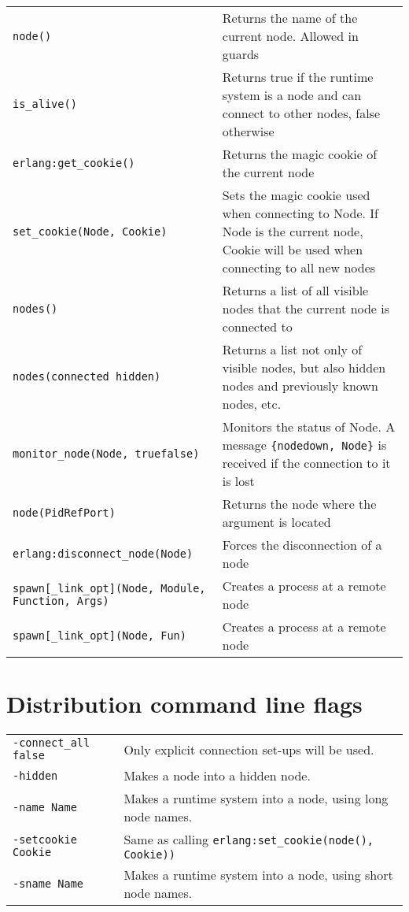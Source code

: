 \begin{center}
\begin{tabular}{|>{\raggedright}p{156pt}|>{\raggedright}p{170pt}|}
\hline
\multicolumn{2}{|p{326pt}|}{Distribution BIFs}\tabularnewline
\hline
\texttt{node()}  & Returns the name of the current node. Allowed in guards\tabularnewline
\hline
\texttt{is\_alive()}  & Returns true if the runtime system is a node and can connect to
other nodes, false otherwise\tabularnewline
\hline
\texttt{erlang:get\_cookie()}  & Returns the magic cookie of the current node\tabularnewline
\hline
\texttt{set\_cookie(Node, Cookie)} & Sets the magic cookie used when connecting to Node.
If Node is the current node, Cookie will be used when connecting to all new nodes\tabularnewline
\hline
\texttt{nodes()}  & Returns a list of all visible nodes that the current node is connected
to\tabularnewline
\hline
\texttt{nodes(connected \textbar{} hidden)}  & Returns a list not only of visible nodes,
but also hidden nodes and previously known nodes, etc. \tabularnewline
\hline
\texttt{monitor\_node(Node, true\textbar{}false)}  & Monitors the status of Node. A message
\texttt{\{nodedown, Node\}} is received if the connection to it is lost\tabularnewline
\hline
\texttt{node(Pid\textbar{}Ref\textbar{}Port)}  & Returns the node where the argument is
located\tabularnewline
\hline
\texttt{erlang:disconnect\_node(Node)}  & Forces the disconnection of a node\tabularnewline
\hline
\texttt{spawn[\_link\textbar{}\_opt](Node, Module, Function, Args)}  & Creates a process
at a remote node\tabularnewline
\hline
\texttt{spawn[\_link\textbar{}\_opt](Node, Fun)}  & Creates a process at a remote node\tabularnewline
\hline
\end{tabular}
\end{center}


\section{Distribution command line flags}

\begin{center}
\begin{tabular}{|>{\raggedright}p{102pt}|>{\raggedright}p{224pt}|}
\hline
\multicolumn{2}{|p{326pt}|}{Distribution command line flags}\tabularnewline
\hline
\texttt{-connect\_all false}  & Only explicit connection set-ups will be used. \tabularnewline
\hline
\texttt{-hidden}  & Makes a node into a hidden node. \tabularnewline
\hline
\texttt{-name Name}  & Makes a runtime system into a node, using long node names. \tabularnewline
\hline
\texttt{-setcookie Cookie}  & Same as calling \linebreak{}
\texttt{erlang:set\_cookie(node(), Cookie))}\tabularnewline
\hline
\texttt{-sname Name}  & Makes a runtime system into a node, using short node names. \tabularnewline
\hline
\end{tabular}
\end{center}


